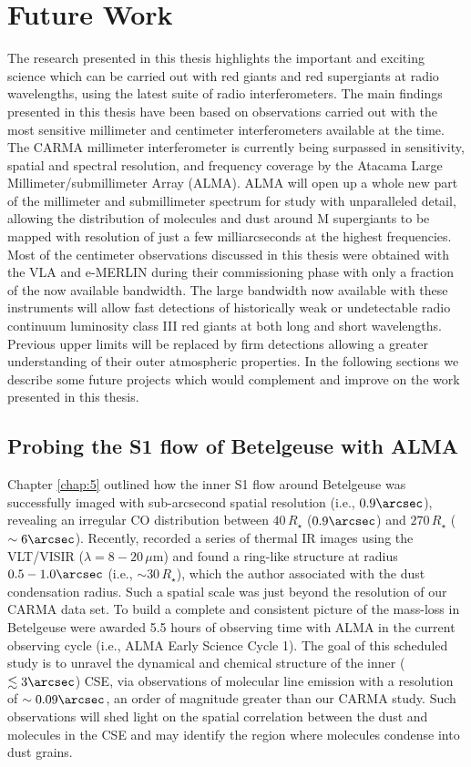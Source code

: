 \section{Future Work}\label{sec:8.2}
The research presented in this thesis highlights the important and exciting science which can be carried out with red giants and red supergiants at radio wavelengths, using the latest suite of radio interferometers. The main findings presented in this thesis have been based on observations carried out with the most sensitive millimeter and centimeter interferometers available at the time. The CARMA millimeter interferometer is currently being surpassed in sensitivity, spatial and spectral resolution, and frequency coverage by the Atacama Large Millimeter/submillimeter Array (ALMA). ALMA will open up a whole new part of the millimeter and submillimeter spectrum for study with  unparalleled detail, allowing the distribution of molecules and dust around M supergiants to be mapped with resolution of just a few milliarcseconds at the highest frequencies. Most of the centimeter observations discussed in this thesis were obtained with the VLA and e-MERLIN during their commissioning phase with only a fraction of the now available bandwidth. The large bandwidth now available with these instruments will  allow fast detections of historically weak or undetectable radio continuum luminosity class III red giants at both long and short wavelengths. Previous upper limits will be replaced by firm detections allowing a greater understanding of their outer atmospheric properties. In the following sections we describe some future projects which would complement and improve on the work presented in this thesis.

\subsection{Probing the S1 flow of Betelgeuse with ALMA}\label{sec:8.2.1}
Chapter \ref{chap:5} outlined how the inner S1 flow around Betelgeuse was successfully imaged with sub-arcsecond spatial resolution (i.e., $0.9\arcsec$), revealing an irregular CO distribution between $40\,R_{\star}$ ($0.9\arcsec$) and $270\,R_{\star}$ ($\sim 6\arcsec$). Recently, \cite{kervella_2011} recorded a series of thermal IR images using the VLT/VISIR ($\lambda = 8-20\,\mu$m) and found a ring-like structure at radius $0.5-1.0\arcsec$ (i.e., $\sim 30\,R_{\star}$), which the author associated with the dust condensation radius. Such a spatial scale was just beyond the resolution of our CARMA data set. To build a complete and consistent picture of the mass-loss in Betelgeuse were awarded 5.5 hours of observing time with ALMA in the current observing cycle (i.e., ALMA Early Science Cycle 1). The goal of this scheduled study is to unravel the dynamical and chemical structure of the inner ($\lesssim 3\arcsec$) CSE, via observations of molecular line emission with a resolution of $\sim 0.09\arcsec$, an order of magnitude greater than our CARMA study. Such observations will shed light on the spatial correlation between the dust and molecules in the CSE and may identify the region where molecules condense into dust grains.

